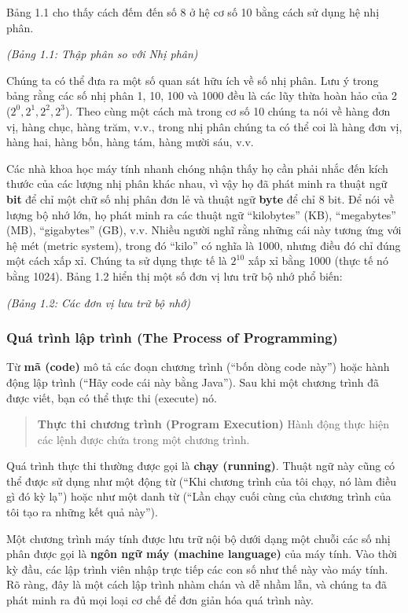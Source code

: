 Bảng 1.1 cho thấy cách đếm đến số 8 ở hệ cơ số 10 bằng cách sử dụng hệ
nhị phân.

\emph{(Bảng 1.1: Thập phân so với Nhị phân)}

Chúng ta có thể đưa ra một số quan sát hữu ích về số nhị phân. Lưu ý
trong bảng rằng các số nhị phân 1, 10, 100 và 1000 đều là các lũy thừa
hoàn hảo của 2 (\(2^0, 2^1, 2^2, 2^3\)). Theo cùng một cách mà trong cơ
số 10 chúng ta nói về hàng đơn vị, hàng chục, hàng trăm, v.v., trong nhị
phân chúng ta có thể coi là hàng đơn vị, hàng hai, hàng bốn, hàng tám,
hàng mười sáu, v.v.

Các nhà khoa học máy tính nhanh chóng nhận thấy họ cần phải nhắc đến
kích thước của các lượng nhị phân khác nhau, vì vậy họ đã phát minh ra
thuật ngữ \textbf{bit} để chỉ một chữ số nhị phân đơn lẻ và thuật ngữ
\textbf{byte} để chỉ 8 bit. Để nói về lượng bộ nhớ lớn, họ phát minh ra
các thuật ngữ ``kilobytes'' (KB), ``megabytes'' (MB), ``gigabytes''
(GB), v.v. Nhiều người nghĩ rằng những cái này tương ứng với hệ mét
(metric system), trong đó ``kilo'' có nghĩa là 1000, nhưng điều đó chỉ
đúng một cách xấp xỉ. Chúng ta sử dụng thực tế là \(2^{10}\) xấp xỉ bằng
1000 (thực tế nó bằng 1024). Bảng 1.2 hiển thị một số đơn vị lưu trữ bộ
nhớ phổ biến:

\emph{(Bảng 1.2: Các đơn vị lưu trữ bộ nhớ)}

\subsubsection{Quá trình lập trình (The Process of
Programming)}\label{quuxe1-truxecnh-lux1eadp-truxecnh-the-process-of-programming}

Từ \textbf{mã (code)} mô tả các đoạn chương trình (``bốn dòng code
này'') hoặc hành động lập trình (``Hãy code cái này bằng Java''). Sau
khi một chương trình đã được viết, bạn có thể thực thi (execute) nó.

\begin{quote}
\textbf{Thực thi chương trình (Program Execution)} Hành động thực hiện
các lệnh được chứa trong một chương trình.
\end{quote}

Quá trình thực thi thường được gọi là \textbf{chạy (running)}. Thuật ngữ
này cũng có thể được sử dụng như một động từ (``Khi chương trình của tôi
chạy, nó làm điều gì đó kỳ lạ'') hoặc như một danh từ (``Lần chạy cuối
cùng của chương trình của tôi tạo ra những kết quả này'').

Một chương trình máy tính được lưu trữ nội bộ dưới dạng một chuỗi các số
nhị phân được gọi là \textbf{ngôn ngữ máy (machine language)} của máy
tính. Vào thời kỳ đầu, các lập trình viên nhập trực tiếp các con số như
thế này vào máy tính. Rõ ràng, đây là một cách lập trình nhàm chán và dễ
nhầm lẫn, và chúng ta đã phát minh ra đủ mọi loại cơ chế để đơn giản hóa
quá trình này.

